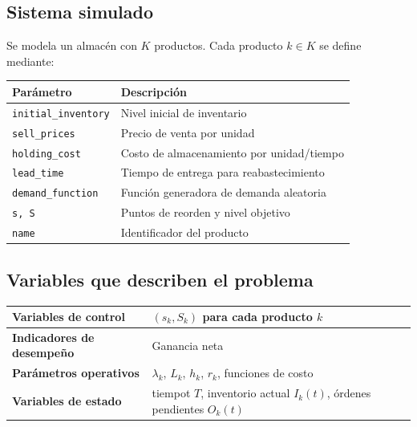 \documentclass{report}
\begin{document}
    \subsection{Sistema simulado}
        Se modela un almacén con $K$ productos. Cada producto $k \in K$ se define mediante:
        \begin{table}[h]
        \centering
        \begin{tabular}{|l|l|}
        \hline
        \textbf{Parámetro} & \textbf{Descripción} \\ \hline
        \texttt{initial\_inventory} & Nivel inicial de inventario \\ \hline
        \texttt{sell\_prices} & Precio de venta por unidad \\ \hline
        \texttt{holding\_cost} & Costo de almacenamiento por unidad/tiempo \\ \hline
        \texttt{lead\_time} & Tiempo de entrega para reabastecimiento \\ \hline
        \texttt{demand\_function} & Función generadora de demanda aleatoria \\ \hline
        \texttt{s, S} & Puntos de reorden y nivel objetivo \\ \hline
        \texttt{name} & Identificador del producto \\ \hline
        \end{tabular}
        \label{tab:producto}
        \end{table}

    \subsection{Variables que describen el problema}
        \begin{table}[h]
        \centering
        \begin{tabular}{|l|l|}
        \hline
        \textbf{Variables de control} & $(s_k, S_k)$ para cada producto $k$ \\ \hline
        \textbf{Indicadores de desempeño} & Ganancia neta \\ \hline
        \textbf{Parámetros operativos} & $\lambda_k$, $L_k$, $h_k$, $r_k$, funciones de costo \\ \hline
        \textbf{Variables de estado} & tiempot $T$, inventorio actual $I_k(t)$, órdenes pendientes $O_k(t)$ \\ \hline
        \end{tabular}
        \end{table}
\end{document}
